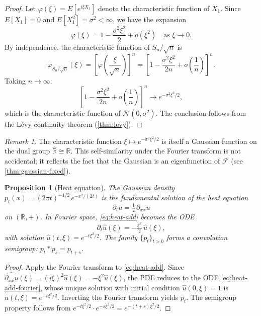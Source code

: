 \documentclass[12pt]{amsart}
\newtheorem{proposition}[theorem]{Proposition}
\theoremstyle{definition}
\theoremstyle{remark}
\newtheorem*{remark}{Remark}
\newcommand{\R}{\mathbb{R}}
\newcommand{\cN}{\mathcal{N}}
\newcommand{\cF}{\mathcal{F}}
\begin{document}
\begin{proof}
Let $\varphi(\xi) = E[e^{i\xi X_1}]$ denote the characteristic function of $X_1$. Since $E[X_1] = 0$ and $E[X_1^2] = \sigma^2 < \infty$, we have the expansion
\[
\varphi(\xi) = 1 - \frac{\sigma^2 \xi^2}{2} + o(\xi^2) \quad \text{as } \xi \to 0.
\]
By independence, the characteristic function of $S_n / \sqrt{n}$ is
\[
\varphi_{S_n/\sqrt{n}}(\xi)
= \left[\varphi\!\left(\frac{\xi}{\sqrt{n}}\right)\right]^n
= \left[1 - \frac{\sigma^2 \xi^2}{2n} + o\!\left(\frac{1}{n}\right)\right]^n.
\]
Taking $n \to \infty$:
\[
\left[1 - \frac{\sigma^2 \xi^2}{2n} + o\!\left(\frac{1}{n}\right)\right]^n \longrightarrow e^{-\sigma^2 \xi^2 / 2},
\]
which is the characteristic function of $\cN(0, \sigma^2)$. The conclusion follows from the L\'evy continuity theorem (\cref{thm:levy}).
\end{proof}

\begin{remark}\label{rmk:gaussian-dual}
The characteristic function $\xi \mapsto e^{-\sigma^2\xi^2/2}$ is itself a Gaussian function on the dual group $\widehat{\R} \cong \R$. This self-similarity under the Fourier transform is not accidental; it reflects the fact that the Gaussian is an eigenfunction of $\cF$ (see \cref{thm:gaussian-fixed}).
\end{remark}

\begin{proposition}[Heat equation]\label{prop:heat-add}
The Gaussian density $p_t(x) = (2\pi t)^{-1/2}\, e^{-x^2/(2t)}$ is the fundamental solution of the heat equation
\begin{equation}\label{eq:heat-add}
\partial_t u = \tfrac{1}{2}\, \partial_{xx} u
\end{equation}
on $(\R, +)$. In Fourier space, \eqref{eq:heat-add} becomes the ODE
\begin{equation}\label{eq:heat-add-fourier}
\partial_t \widehat{u}(\xi) = -\tfrac{\xi^2}{2}\, \widehat{u}(\xi),
\end{equation}
with solution $\widehat{u}(t, \xi) = e^{-t\xi^2/2}$. The family $\{p_t\}_{t > 0}$ forms a convolution semigroup: $p_t * p_s = p_{t+s}$.
\end{proposition}

\begin{proof}
Apply the Fourier transform to \eqref{eq:heat-add}. Since $\widehat{\partial_{xx} u}(\xi) = (i\xi)^2 \widehat{u}(\xi) = -\xi^2 \widehat{u}(\xi)$, the PDE reduces to the ODE \eqref{eq:heat-add-fourier}, whose unique solution with initial condition $\widehat{u}(0, \xi) = 1$ is $\widehat{u}(t, \xi) = e^{-t\xi^2/2}$. Inverting the Fourier transform yields $p_t$. The semigroup property follows from $e^{-t\xi^2/2} \cdot e^{-s\xi^2/2} = e^{-(t+s)\xi^2/2}$.
\end{proof}
\end{document}
